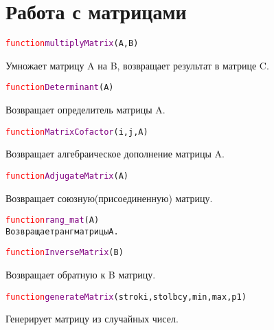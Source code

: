 \documentclass[a4paper,12pt]{article}
\begin{document}
	\section{Работа с матрицами}

	\begin{alltt} 	\textcolor{Red}{function} \textcolor{Purple}{multiplyMatrix}(A,B)
	\end{alltt}
	Умножает матрицу A на B, возвращает результат в матрице C.
	\begin{alltt} 	\textcolor{Red}{function} \textcolor{Purple}{Determinant}(A)
	\end{alltt}
	Возвращает определитель матрицы A.
	\begin{alltt} 	\textcolor{Red}{function} \textcolor{Purple}{MatrixCofactor}(i,j,A)
	\end{alltt}
	Возвращает алгебраическое дополнение матрицы A.
	\begin{alltt} 	\textcolor{Red}{function} \textcolor{Purple}{AdjugateMatrix}(A)
	\end{alltt}
	Возвращает союзную(присоединенную) матрицу.
	\begin{alltt} 	\textcolor{Red}{function} \textcolor{Purple}{rang_mat}(А)
	Возвращает ранг матрицы A.
	\end{alltt}
	\begin{alltt} 	\textcolor{Red}{function} \textcolor{Purple}{InverseMatrix}(B)
	\end{alltt}
	Возвращает обратную  к B матрицу.
		\begin{alltt} 	\textcolor{Red}{function} \textcolor{Purple}{generateMatrix}(stroki,stolbcy,min,max,p1)
	\end{alltt}
	Генерирует матрицу из случайных чисел.
\end{document}
